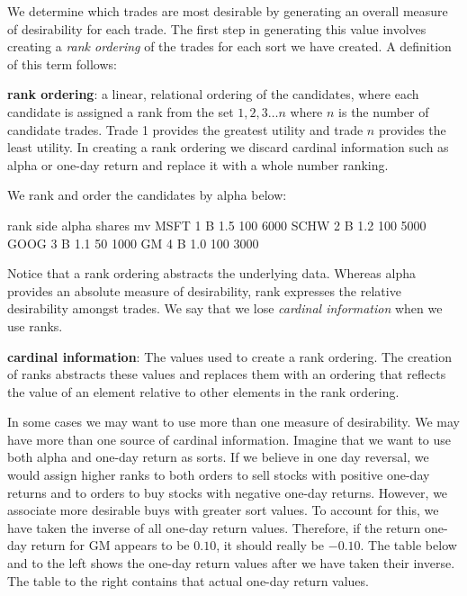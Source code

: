\documentclass{article}
\begin{document}
We determine which trades are most desirable by generating an overall
measure of desirability for each trade.  The first step in generating
this value involves creating a \emph{rank ordering} of the trades for each
sort we have created.  A definition of this term follows:

\begin{description}

  \item{\bf{rank ordering}}: a linear, relational ordering of the
  candidates, where each candidate is assigned a rank from the set $1, 2,
  3\dots{}n$ where $n$ is the number of candidate trades.  Trade 1
  provides the greatest  utility and trade $n$ provides the
  least  utility.  In creating a rank ordering we discard
  cardinal information such as alpha or one-day return and replace it
  with a whole number ranking.


\end{description}

We rank and order the candidates by alpha below:

\begin{Schunk}
\begin{Soutput}
     rank side alpha shares   mv
MSFT    1    B   1.5    100 6000
SCHW    2    B   1.2    100 5000
GOOG    3    B   1.1     50 1000
GM      4    B   1.0    100 3000
\end{Soutput}
\end{Schunk}

Notice that a rank ordering abstracts the underlying data.  Whereas
alpha provides an absolute measure of desirability, rank expresses the
relative desirability amongst trades.  We say that we lose
\emph{cardinal information} when we use ranks.

\begin{description}

\item{\bf{cardinal information}}: The values used to create a rank
  ordering.  The creation of ranks abstracts these values and replaces
  them with an ordering that reflects the value of an element relative
  to other elements in the rank ordering.

\end{description}

In some cases we may want to use more than one measure of
desirability.  We may have more than one source of cardinal
information.  Imagine that we want to use both alpha and one-day
return as sorts.  If we believe in one day reversal, we would assign
higher ranks to both orders to sell stocks with positive one-day
returns and to orders to buy stocks with negative one-day returns.
However, we associate more desirable buys with greater sort values.
To account for this, we have taken the inverse of all one-day return
values.  Therefore, if the return one-day return for GM appears to be
$0.10$, it should really be $-0.10$.  The table below and to the left
shows the one-day return values after we have taken their inverse.
The table to the right contains that actual one-day return values.
\end{document}
